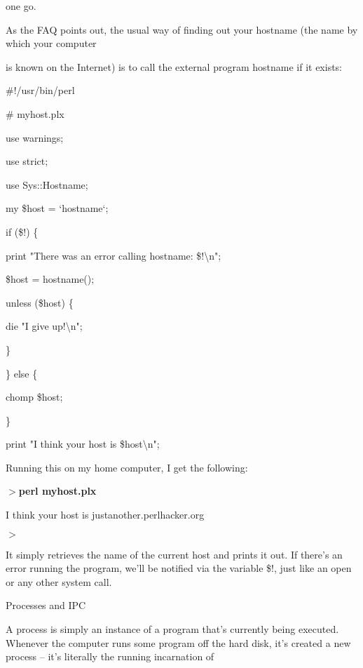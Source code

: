 \documentclass[a4paper,11pt]{book}
\begin{document}
\noindent one go.

\noindent 

\noindent As the FAQ points out, the usual way of finding out your hostname (the name by which your computer

\noindent is known on the Internet) is to call the external program hostname if it exists:

\noindent 

\noindent \#!/usr/bin/perl

\noindent \# myhost.plx

\noindent use warnings;

\noindent use strict;

\noindent use Sys::Hostname;

\noindent 

\noindent my \$host = `hostname`;

\noindent if (\$!) \{

\noindent print "There was an error calling hostname: \$!\textbackslash n";

\noindent \$host = hostname();

\noindent unless (\$host) \{

\noindent die "I give up!\textbackslash n";

\noindent \}

\noindent \} else \{

\noindent chomp \$host;

\noindent \}

\noindent print "I think your host is \$host\textbackslash n";

\noindent 

\noindent Running this on my home computer, I get the following:

\noindent 

\noindent $>$\textbf{perl myhost.plx}

\noindent I think your host is justanother.perlhacker.org

\noindent $>$

\noindent 

\noindent It simply retrieves the name of the current host and prints it out. If there's an error running the program, we'll be notified via the variable \$!, just like an open or any other system call.

\noindent 

\noindent Processes and IPC

\noindent 

\noindent A process is simply an instance of a program that's currently being executed. Whenever the computer runs some program off the hard disk, it's created a new process -- it's literally the running incarnation of
\end{document}

